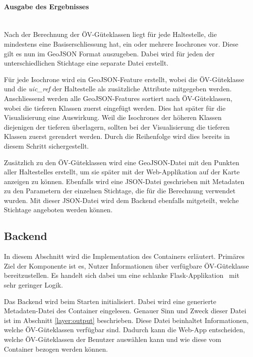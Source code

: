 \paragraph{Ausgabe des Ergebnisses}~\\
Nach der Berechnung der \gls{ÖV-Güteklassen} liegt für jede \gls{Haltestelle}, die mindestens eine Basiserschliessung hat, ein oder mehrere \glspl{Isochrone} vor.
Diese gilt es nun im \gls{GeoJSON} Format auszugeben.
Dabei wird für jeden der unterschiedlichen Stichtage eine separate Datei erstellt.

Für jede \gls{Isochrone} wird ein \gls{GeoJSON-Feature} erstellt, wobei die \acs{ÖV}-Güteklasse und die \emph{uic\_ref} der \gls{Haltestelle} als zusätzliche Attribute mitgegeben werden.
Anschliessend werden alle \glspl{GeoJSON-Feature} sortiert nach \gls{ÖV-Güteklassen}, wobei die tieferen Klassen zuerst eingefügt werden.
Dies hat später für die Visualisierung eine Auswirkung.
Weil die \glspl{Isochrone} der höheren Klassen diejenigen der tieferen überlagern, sollten bei der Visualisierung die tieferen Klassen zuerst gerendert werden.
Durch die Reihenfolge wird dies bereits in diesem Schritt sichergestellt.

Zusätzlich zu den \gls{ÖV-Güteklassen} wird eine \gls{GeoJSON}-Datei mit den Punkten aller \glspl{Haltestelle} erstellt, um sie später mit der Web-Applikation auf der Karte anzeigen zu können.
Ebenfalls wird eine JSON-Datei geschrieben mit Metadaten zu den Parametern der einzelnen Stichtage, die für die Berechnung verwendet wurden.
Mit dieser JSON-Datei wird dem Backend ebenfalls mitgeteilt, welche Stichtage angeboten werden können.

\subsection{Backend}
\label{Implementation:Backend}

In diesem Abschnitt wird die Implementation des Containers  erläutert.
Primäres Ziel der Komponente ist es, Nutzer Informationen über verfügbare \acs{ÖV}-Güteklasse bereitzustellen.
Es handelt sich dabei um eine schlanke Flask-Applikation~\cite{flask} mit sehr geringer Logik.

Das Backend wird beim Starten initialisiert.
Dabei wird eine generierte Metadaten-Datei des Container  eingelesen.
Genauer Sinn und Zweck dieser Datei ist im Abschnitt \ref{layer:output} beschrieben.
Diese Datei beinhaltet Informationen, welche \gls{ÖV-Güteklassen} verfügbar sind.
Dadurch kann die Web-App entscheiden, welche \gls{ÖV-Güteklassen} der Benutzer auswählen kann und wie diese vom Container  bezogen werden können.

